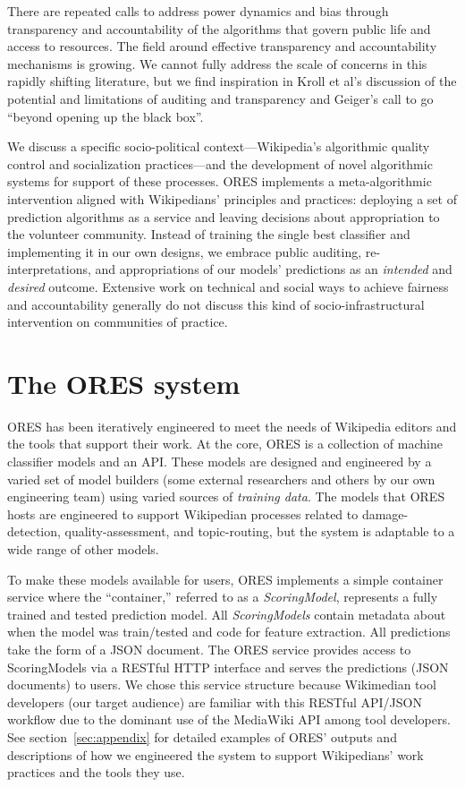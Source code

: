 \documentclass{sigchi-ext}
\begin{document}
There are repeated calls to address power dynamics and bias through transparency and accountability of the algorithms that govern public life and access to resources\cite{diakopoulos2017algorithmic,sandvig2014auditing}. The field around effective transparency and accountability mechanisms is growing. We cannot fully address the scale of concerns in this rapidly shifting literature, but we find inspiration in Kroll et al's discussion of the potential and limitations of auditing and transparency \cite{kroll2016accountable} and Geiger's call to go ``beyond opening up the black box\cite{geiger2017beyond}''.

We discuss a specific socio-political context---Wikipedia's algorithmic quality control and socialization practices---and the development of novel algorithmic systems for support of these processes.  ORES implements a meta-algorithmic intervention aligned with Wikipedians' principles and practices: deploying a set of prediction algorithms as a service and leaving decisions about appropriation to the volunteer community.  Instead of training the single best classifier and implementing it in our own designs, we embrace public auditing, re-interpretations, and appropriations of our models' predictions as an \emph{intended} and \emph{desired} outcome.  Extensive work on technical and social ways to achieve fairness and accountability generally do not discuss this kind of socio-infrastructural intervention on communities of practice.

\section{The ORES system}

ORES has been iteratively engineered to meet the needs of Wikipedia editors and the tools that support their work.  At the core, ORES is a collection of machine classifier models and an API.  These models are designed and engineered by a varied set of model builders (some external researchers and others by our own engineering team) using varied sources of \emph{training data}.  The models that ORES hosts are engineered to support Wikipedian processes related to damage-detection, quality-assessment, and topic-routing, but the system is adaptable to a wide range of other models.

To make these models available for users, ORES implements a simple container service where the ``container,'' referred to as a \emph{ScoringModel}, represents a fully trained and tested prediction model.  All \emph{ScoringModels} contain metadata about when the model was train/tested and code for feature extraction.  All predictions take the form of a JSON document.  The ORES service provides access to ScoringModels via a RESTful HTTP interface and serves the predictions (JSON documents) to users.  We chose this service structure because Wikimedian tool developers (our target audience) are familiar with this RESTful API/JSON workflow due to the dominant use of the MediaWiki API among tool developers.  See section~\ref{sec:appendix} for detailed examples of ORES' outputs and descriptions of how we engineered the system to support Wikipedians' work practices and the tools they use.
\end{document}
